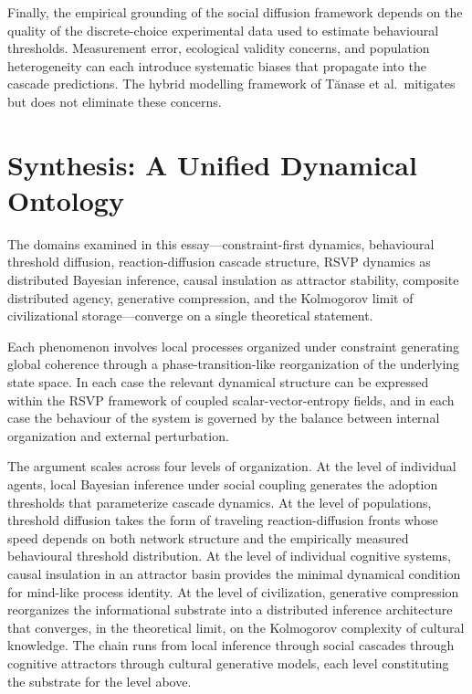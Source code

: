 \documentclass[12pt,a4paper]{article}
\theoremstyle{plain}
\theoremstyle{definition}
\begin{document}
Finally, the empirical grounding of the social diffusion framework depends on the quality of the discrete-choice experimental data used to estimate behavioural thresholds. Measurement error, ecological validity concerns, and population heterogeneity can each introduce systematic biases that propagate into the cascade predictions. The hybrid modelling framework of Tănase et al.\ mitigates but does not eliminate these concerns.

\section{Synthesis: A Unified Dynamical Ontology}
\label{sec:synthesis}

The domains examined in this essay—constraint-first dynamics, behavioural threshold diffusion, reaction-diffusion cascade structure, RSVP dynamics as distributed Bayesian inference, causal insulation as attractor stability, composite distributed agency, generative compression, and the Kolmogorov limit of civilizational storage—converge on a single theoretical statement.

Each phenomenon involves local processes organized under constraint generating global coherence through a phase-transition-like reorganization of the underlying state space. In each case the relevant dynamical structure can be expressed within the RSVP framework of coupled scalar-vector-entropy fields, and in each case the behaviour of the system is governed by the balance between internal organization and external perturbation.

The argument scales across four levels of organization. At the level of individual agents, local Bayesian inference under social coupling generates the adoption thresholds that parameterize cascade dynamics. At the level of populations, threshold diffusion takes the form of traveling reaction-diffusion fronts whose speed depends on both network structure and the empirically measured behavioural threshold distribution. At the level of individual cognitive systems, causal insulation in an attractor basin provides the minimal dynamical condition for mind-like process identity. At the level of civilization, generative compression reorganizes the informational substrate into a distributed inference architecture that converges, in the theoretical limit, on the Kolmogorov complexity of cultural knowledge. The chain runs from local inference through social cascades through cognitive attractors through cultural generative models, each level constituting the substrate for the level above.
\end{document}
